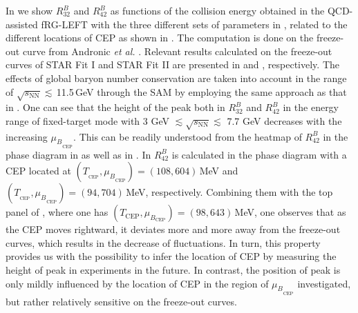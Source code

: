 \documentclass[reprint,twocolumn,superscriptaddress,preprintnumbers,amsmath,amssymb,aps,prd,floatfix]{revtex4-2}
\begin{document}
In  we show $R_{32}^{B}$ and $R_{42}^{B}$ as functions of the collision energy obtained in the QCD-assisted fRG-LEFT with the three different sets of parameters in , related to the different locations of CEP as shown in . The computation is done on the freeze-out curve from Andronic {\it et al.} \cite{Andronic:2017pug}. Relevant results calculated on the freeze-out curves of STAR Fit I and STAR Fit II are presented in  and , respectively. The effects of global baryon number conservation are taken into account in the range of $\sqrt{s_{\mathrm{NN}}}\lesssim$\,11.5\,GeV through the SAM by employing the same approach as that in  . One can see that the height of the peak both in $R_{32}^{B}$ and $R_{42}^{B}$ in the energy range of fixed-target mode with 3 GeV $\lesssim\sqrt{s_{\mathrm{NN}}}\lesssim$ 7.7 GeV decreases with the increasing ${\mu_B}_{_{\mathrm{CEP}}}$. This can be readily understood from the heatmap of $R_{42}^{B}$ in the phase diagram in  as well as in . In  $R_{42}^{B}$ is calculated in the phase diagram with a CEP located at $(T_{_{\mathrm{CEP}}},{\mu_B}_{_{\mathrm{CEP}}})=(108, 604)$\,MeV and $(T_{_{\mathrm{CEP}}},{\mu_B}_{_{\mathrm{CEP}}})=(94, 704)$\,MeV, respectively. Combining them with the top panel of , where one has $(T_\mathrm{CEP},\mu_{B_{\mathrm{CEP}}})=(98,643)$\,MeV, one observes that as the CEP moves rightward, it deviates more and more away from the freeze-out curves, which results in the decrease of fluctuations. In turn, this property provides us with the possibility to infer the location of CEP by measuring the height of peak in experiments in the future. In contrast, the position of peak is only mildly influenced by the location of CEP in the region of ${\mu_B}_{_{\mathrm{CEP}}}$ investigated, but rather relatively sensitive on the freeze-out curves.




	
	
\end{document}
